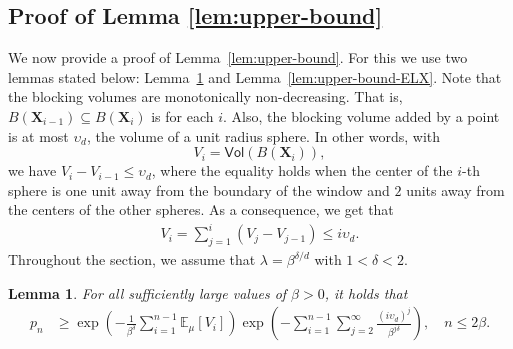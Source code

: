 \documentclass[pdflatex, sn-mathphys-ay]{sn-jnl}%
\renewcommand{\v}[1]{\boldsymbol{#1}}
\newcommand{\ee}{\mathbb{E}}
\newcommand{\mX}{\v{X}}
\newcommand{\lt}{\left}
\newcommand{\rt}{\right}
\newcommand{\vol}{\mathsf{Vol}}
\newtheorem{lemma}{Lemma}
\theoremstyle{thmstyleone}%
\theoremstyle{thmstyletwo}%
\theoremstyle{thmstylethree}%
\begin{document}
\begin{appendices}
\section{Proof of Lemma \ref{lem:upper-bound}}\label{app:add-proofs}
We now provide a proof of Lemma~\ref{lem:upper-bound}. For this we use two lemmas stated below: Lemma~\ref{lem:lower-bound-pn} and Lemma~\ref{lem:upper-bound-ELX}. Note that the blocking volumes are monotonically non-decreasing. That is, $B(\mX_{i-1}) \subseteq B(\mX_{i})$ is for each $i$.  Also, the blocking volume added by a point is at most $\upsilon_d$, the volume of a unit radius sphere. In other words, with 
\[
V_i = \vol(B(\mX_i)),
\]
we have $V_i - V_{i-1} \leq \upsilon_d$,
where the equality holds when the center of the $i$-th sphere is one unit away from the boundary of the window and $2$ units away from the centers of the other spheres.
As a consequence, we get that
\begin{align}
\label{eqn:bounds_on_vi}
V_{i}  = \sum_{j = 1}^{i} \lt(V_{j} - V_{j-1}\rt) \leq i \upsilon_d.
\end{align}
Throughout the section, we assume that $\lambda = \beta^{\delta/d}$ with $1 < \delta  < 2$.
\begin{lemma}
    \label{lem:lower-bound-pn}
    For all sufficiently large values of $\beta>0$, it holds that
\begin{align*}
    p_n &\geq \exp\lt( - \frac{1}{\beta^{\delta}}\sum_{i = 1}^{n -1} \ee_\mu[V_i]\rt) \exp\lt( - \sum_{i = 1}^{n -1} \sum_{j = 2}^\infty \frac{(i\upsilon_d)^j}{\beta^{j\delta}}\rt), \quad n \leq 2\beta.
\end{align*}
\end{lemma}


\end{appendices}
\end{document}
